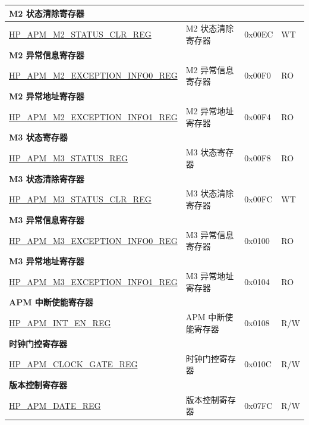 \begin{longtable}{ | p{6cm} | p{6.2cm} | p{2.2cm} | p{1cm} | }
\multicolumn{4}{|l|}{\textbf{M2 状态清除寄存器}} \\ \hline
\hyperref[regdesc:HPAPMM2STATUSCLRREG]{HP\_APM\_M2\_STATUS\_CLR\_REG} & M2 状态清除寄存器 & 0x00EC & WT \\ \hline
\multicolumn{4}{|l|}{\textbf{M2 异常信息寄存器}} \\ \hline
\hyperref[regdesc:HPAPMM2EXCEPTIONINFO0REG]{HP\_APM\_M2\_EXCEPTION\_INFO0\_REG} & M2 异常信息寄存器 & 0x00F0 & RO \\ \hline
\multicolumn{4}{|l|}{\textbf{M2 异常地址寄存器}} \\ \hline
\hyperref[regdesc:HPAPMM2EXCEPTIONINFO1REG]{HP\_APM\_M2\_EXCEPTION\_INFO1\_REG} & M2 异常地址寄存器 & 0x00F4 & RO \\ \hline
\multicolumn{4}{|l|}{\textbf{M3 状态寄存器}} \\ \hline
\hyperref[regdesc:HPAPMM3STATUSREG]{HP\_APM\_M3\_STATUS\_REG} & M3 状态寄存器 & 0x00F8 & RO \\ \hline
\multicolumn{4}{|l|}{\textbf{M3 状态清除寄存器}} \\ \hline
\hyperref[regdesc:HPAPMM3STATUSCLRREG]{HP\_APM\_M3\_STATUS\_CLR\_REG} & M3 状态清除寄存器 & 0x00FC & WT \\ \hline
\multicolumn{4}{|l|}{\textbf{M3 异常信息寄存器}} \\ \hline
\hyperref[regdesc:HPAPMM3EXCEPTIONINFO0REG]{HP\_APM\_M3\_EXCEPTION\_INFO0\_REG} & M3 异常信息寄存器 & 0x0100 & RO \\ \hline
\multicolumn{4}{|l|}{\textbf{M3 异常地址寄存器}} \\ \hline
\hyperref[regdesc:HPAPMM3EXCEPTIONINFO1REG]{HP\_APM\_M3\_EXCEPTION\_INFO1\_REG} & M3 异常地址寄存器 & 0x0104 & RO \\ \hline
\multicolumn{4}{|l|}{\textbf{APM 中断使能寄存器}} \\ \hline
\hyperref[regdesc:HPAPMINTENREG]{HP\_APM\_INT\_EN\_REG} & APM 中断使能寄存器 & 0x0108 & R/W \\ \hline
\multicolumn{4}{|l|}{\textbf{时钟门控寄存器}} \\ \hline
\hyperref[regdesc:HPAPMCLOCKGATEREG]{HP\_APM\_CLOCK\_GATE\_REG} & 时钟门控寄存器 & 0x010C & R/W \\ \hline
\multicolumn{4}{|l|}{\textbf{版本控制寄存器}} \\ \hline
\hyperref[regdesc:HPAPMDATEREG]{HP\_APM\_DATE\_REG} & 版本控制寄存器 & 0x07FC & R/W \\ \hline
\end{longtable}
